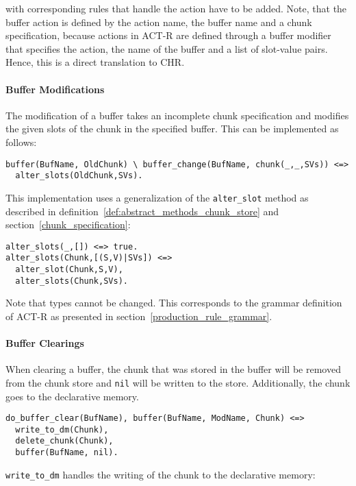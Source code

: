with corresponding rules that handle the action have to be added. Note, that the buffer action is defined by the action name, the buffer name and a chunk specification, because actions in ACT-R are defined through a buffer modifier that specifies the action, the name of the buffer and a list of slot-value pairs. Hence, this is a direct translation to CHR.

\paragraph{Buffer Modifications}

The modification of a buffer takes an incomplete chunk specification and modifies the given slots of the chunk in the specified buffer. This can be implemented as follows:

\begin{lstlisting}
buffer(BufName, OldChunk) \ buffer_change(BufName, chunk(_,_,SVs)) <=>
  alter_slots(OldChunk,SVs).
\end{lstlisting}

This implementation uses a generalization of the \verb|alter_slot| method as described in definition~\ref{def:abstract_methods_chunk_store} and section~\ref{chunk_specification}:

\begin{lstlisting}  
alter_slots(_,[]) <=> true.
alter_slots(Chunk,[(S,V)|SVs]) <=> 
  alter_slot(Chunk,S,V),
  alter_slots(Chunk,SVs). 
\end{lstlisting}

Note that types cannot be changed. This corresponds to the grammar definition of ACT-R as presented in section~\ref{production_rule_grammar}.

\paragraph{Buffer Clearings}

When clearing a buffer, the chunk that was stored in the buffer will be removed from the chunk store and \verb|nil| will be written to the store. Additionally, the chunk goes to the declarative memory.

\begin{lstlisting}
do_buffer_clear(BufName), buffer(BufName, ModName, Chunk) <=> 
  write_to_dm(Chunk), 
  delete_chunk(Chunk), 
  buffer(BufName, nil).
\end{lstlisting}

\verb|write_to_dm| handles the writing of the chunk to the declarative memory:

